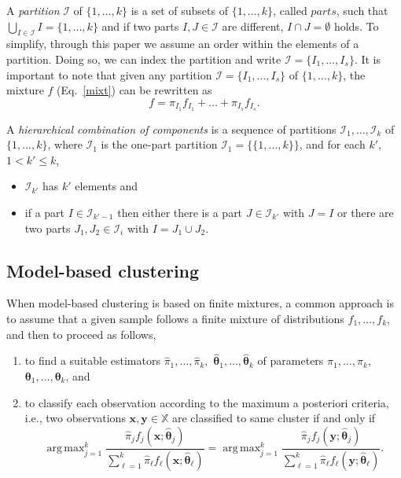 \documentclass[10pt, a4paper]{article}
\DeclareMathOperator*{\argmax}{arg\,max}
\newcommand{\m}[1]{\boldsymbol{#1}}
\begin{document}
A \emph{partition} $\mathcal{I}$ of $\{1, \dots, k\}$ is a set of subsets of $\{1, \dots, k\}$, called $parts$, such that $\bigcup_{I \in \mathcal{I}} I = \{1, \dots, k\}$ and  if two parts $I, J \in \mathcal{I}$ are different, $I \cap J = \emptyset$ holds. To simplify, through this paper we assume an order within the elements of a partition. Doing so, we can index the partition and write $\mathcal{I} = \{ I_1, \dots, I_s\}$. It is important to note that given any partition $\mathcal{I} = \{ I_1, \dots, I_s\}$ of $\{1, \dots, k\}$, the mixture $f$ (Eq.~\ref{mixt}) can be rewritten as
\begin{equation}
f = \pi_{I_1} f_{I_1} + \dots + \pi_{I_s} f_{I_s}.
\label{mixt_part}
\end{equation}


A \emph{hierarchical combination of components} is a sequence of partitions $\mathcal{I}_1, \dots, \mathcal{I}_k$ of $\{1,...,k\}$, where $\mathcal{I}_1$ is the one-part partition $\mathcal{I}_1 = \{ \{1, \dots, k\} \}$, and for each $k'$, $1 <  k' \leq k$,
\begin{itemize}
\item $\mathcal{I}_{k'}$ has $k'$ elements  and
\item if a part $I \in \mathcal{I}_{k'-1}$ then either there is a part $J \in \mathcal{I}_{k'}$ with $J = I$ or there are two parts $J_1, J_2 \in \mathcal{I}_i$ with $I = J_1 \cup J_2$.
\end{itemize}


\subsection*{Model-based clustering}

When model-based clustering is based on finite mixtures, a common approach is to assume that a given sample follows a finite mixture of distributions $f_1, \dots, f_k$, and then to proceed as follows, 
\begin{enumerate}
\item to find a suitable estimators $\hat{\pi}_1, \dots, \hat{\pi}_k,$ $\hat{\m\theta}_1, \dots, \hat{\m\theta}_k$ of parameters $\pi_1, \dots, \pi_k,$ $\m\theta_1, \dots, \m\theta_k$, and
\item to classify each observation according to the maximum a posteriori criteria, i.e., two observations $\m x, \m y \in \mathbb{X}$ are classified to same cluster if and only if
\[
\argmax_{j=1}^k \frac{ \hat{\pi}_j f_j(\m x ; \hat{\m\theta}_j) }{\sum_{\ell=1}^k \hat{\pi}_\ell f_\ell(\m x ; \hat{\m\theta}_\ell) } = \argmax_{j=1}^k \frac{ \hat{\pi}_j f_j(\m y ; \hat{\m\theta}_j) }{ \sum_{\ell=1}^k \hat{\pi}_\ell f_\ell(\m y ; \hat{\m\theta}_\ell) }.
\]
\end{enumerate}
\end{document}
